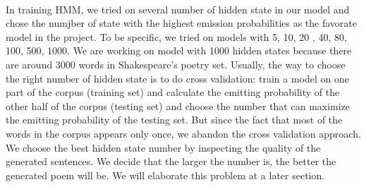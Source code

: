 %
\paragraph{}
In training HMM, we tried on several number of hidden state in our model and chose the numjber of state with the highest emission probabilities as the favorate model in the project. To be specific, we tried on models with 5, 10, 20 , 40, 80, 100, 500, 1000. We are working on model with 1000 hidden states because there are around 3000 words in Shakespeare's poetry set.
Usually, the way to choose the right number of hidden state is to do cross validation: train a model on one part of the corpus (training set) and calculate the emitting probability of the other half of the corpus (testing set) and choose the number that can maximize the emitting probability of the testing set. But since the fact that most of the words in the corpus appears only once, we abandon the cross validation approach. We choose the best hidden state number by inspecting the quality of the generated sentences. We decide that the larger the number is, the better the generated poem will be. We will elaborate this problem at a later section. 
